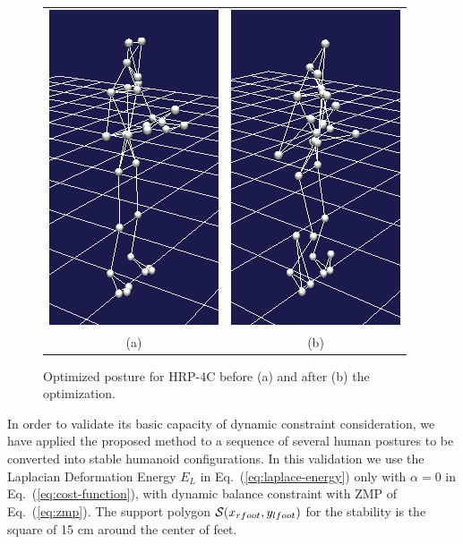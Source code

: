 \documentclass[letterpaper, 10 pt, conference]{ieeeconf}  %
\begin{document}
\begin{figure}[b]
  \begin{center}
    \begin{tabular}{cc}
    \includegraphics[width=0.35 \linewidth]{figure/before}&
    \includegraphics[width=0.35
    \linewidth]{figure/after}\vspace*{-1mm}\\
    (a) & (b)
    \end{tabular}
    \caption{Optimized posture for HRP-4C before (a) and after (b)
      the optimization.}
    \label{fig:choreonoid-result}
  \end{center}
\end{figure}

In order to validate its basic capacity of dynamic constraint
consideration, we have applied the proposed method to a sequence
of several human postures to be converted into stable humanoid
configurations. 
In this validation we use the Laplacian Deformation Energy
$E_L$ in Eq.~(\ref{eq:laplace-energy}) only with $\alpha=0$ in
Eq.~(\ref{eq:cost-function}), 
with dynamic balance constraint with ZMP of Eq.~(\ref{eq:zmp}).
The support polygon ${\cal S}(x_{rfoot}, y_{lfoot})$ for the stability
is the square of 15 cm around the center of feet.
\end{document}
